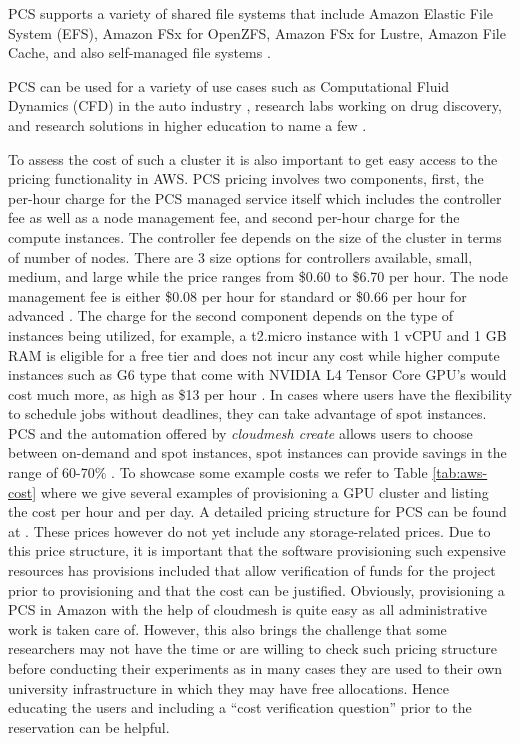 \documentclass[utf8]{FrontiersinVancouver} %
\begin{document}
PCS supports a variety of shared file systems that include Amazon Elastic File System (EFS), Amazon FSx for OpenZFS, Amazon FSx for Lustre, Amazon File Cache, and also self-managed file systems \citep{awspcsstorage:online}.

PCS can be used for a variety of use cases such as Computational Fluid Dynamics (CFD) in the auto industry \citep{CFD:online}, research labs working on drug discovery, and research solutions in higher education to name a few \citep{awspcsblob1:online}. 

To assess the cost of such a cluster it is also important to get easy access to the pricing functionality in AWS.
PCS pricing involves two components, first, the per-hour charge for the PCS managed service itself which includes the controller fee as well as a node management fee, and second per-hour charge for the compute instances. The controller fee depends on the size of the cluster in terms of number of nodes. There are 3 size options for controllers available, small, medium, and large while the price ranges from \$0.60 to \$6.70 per hour. The node management fee is either \$0.08 per hour for standard or \$0.66 per hour for advanced \citep{HPCpricing:online}. The charge for the second component depends on the type of instances being utilized, for example, a t2.micro instance with 1 vCPU and 1 GB RAM is eligible for a free tier and does not incur any cost while higher compute instances such as G6 type that come with NVIDIA L4 Tensor Core GPU's would cost much more, as high as \$13 per hour \citep{ec2ondemand:online}. In cases where users have the flexibility to schedule jobs without deadlines, they can take advantage of spot instances. PCS and the automation offered by {\em cloudmesh create} allows users to choose between on-demand and spot instances, spot instances can provide savings in the range of 60-70\% \citep{spotSavings:online}.
To showcase some example costs we refer to Table \ref{tab:aws-cost} where we give several examples of provisioning a GPU cluster and listing the cost per hour and per day. A detailed pricing structure for PCS can be found at \citep{www-aws-pricing}. 
These prices however do not yet include any storage-related prices. Due to this price structure, it is important that the software provisioning such expensive resources has provisions included that allow verification of funds for the project prior to provisioning and that the cost can be justified. Obviously, provisioning a PCS in Amazon with the help of cloudmesh is quite easy as all administrative work is taken care of. However, this also brings the challenge that some researchers may not have the time or are willing to check such pricing structure before conducting their experiments as in many cases they are used to their own university infrastructure in which they may have free allocations. Hence educating the users and including a ``cost verification question'' prior to the reservation can be helpful.
\end{document}

